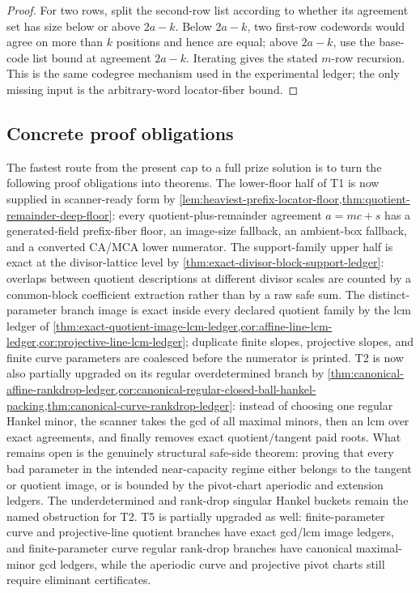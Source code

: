 \documentclass[11pt]{article}
\theoremstyle{definition}
\theoremstyle{remark}
\begin{document}
\begin{proof}
For two rows, split the second-row list according to whether its agreement set
has size below or above $2a-k$.  Below $2a-k$, two first-row codewords would
agree on more than $k$ positions and hence are equal; above $2a-k$, use the
base-code list bound at agreement $2a-k$.  Iterating gives the stated $m$-row
recursion.  This is the same codegree mechanism used in the experimental ledger;
the only missing input is the arbitrary-word locator-fiber bound.
\end{proof}

\subsection{Concrete proof obligations}

The fastest route from the present cap to a full prize solution is to turn the
following proof obligations into theorems.  The lower-floor half of T1 is now supplied in scanner-ready form by
\cref{lem:heaviest-prefix-locator-floor,thm:quotient-remainder-deep-floor}: every
quotient-plus-remainder agreement $a=mc+s$ has a generated-field prefix-fiber
floor, an image-size fallback, an ambient-box fallback, and a converted CA/MCA
lower numerator.  The support-family upper half is exact at the divisor-lattice
level by \cref{thm:exact-divisor-block-support-ledger}: overlaps between quotient
descriptions at different divisor scales are counted by a common-block
coefficient extraction rather than by a raw safe sum.  The distinct-parameter
branch image is exact inside every declared quotient family by the lcm ledger of
\cref{thm:exact-quotient-image-lcm-ledger,cor:affine-line-lcm-ledger,cor:projective-line-lcm-ledger}; duplicate finite slopes, projective slopes, and
finite curve parameters are coalesced before the numerator is printed.  T2 is now
also partially upgraded on its regular overdetermined branch by
\cref{thm:canonical-affine-rankdrop-ledger,cor:canonical-regular-closed-ball-hankel-packing,thm:canonical-curve-rankdrop-ledger}: instead of choosing one regular
Hankel minor, the scanner takes the gcd of all maximal minors, then an lcm over
exact agreements, and finally removes exact quotient/tangent paid roots.  What
remains open is the genuinely structural safe-side theorem: proving that every
bad parameter in the intended near-capacity regime either belongs to the tangent
or quotient image, or is bounded by the pivot-chart aperiodic and extension
ledgers.  The underdetermined and rank-drop singular Hankel buckets remain the
named obstruction for T2.  T5 is partially upgraded as well: finite-parameter
curve and projective-line quotient branches have exact gcd/lcm image ledgers,
and finite-parameter curve regular rank-drop branches have canonical maximal-minor
gcd ledgers, while the aperiodic curve and projective pivot charts still require
eliminant certificates.
\end{document}
